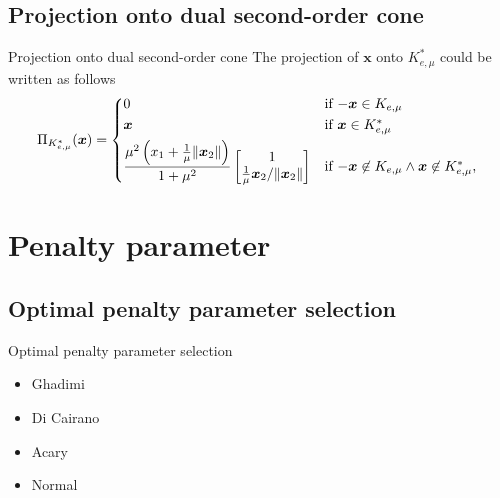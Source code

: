 \documentclass[8pt,red]{beamer}
\theoremstyle{plain}
\theoremstyle{definition}
\theoremstyle{remark}
\newcommand{\bi}[1]{\ensuremath{\boldsymbol{#1}}}
\begin{document}
\subsection{Projection onto dual second-order cone}
\begin{frame}{Projection onto dual second-order cone}
The projection of $\bi{x}$ onto $K_{e,\mu}^{*}$ could be written as follows
\begin{align}
  \Pi_{K_{e,\mu}^{*}}(\bi{x}) = 
  \begin{dcases*}
	0
    & if $-\bi{x} \in K_{e,\mu}$ \\
    \bi{x}
    & if $\bi{x} \in K_{e,\mu}^{*}$ \\
    \frac{\mu^{2} \left(x_{1} + \frac{1}{\mu} \| \bi{x}_{2} \|\right)}{1+\mu^{2}} 
    \begin{bmatrix}
      1 \\    \frac{1}{\mu} \bi{x}_{2} / \| \bi{x}_{2} \| 
    \end{bmatrix}
    & if $-\bi{x} \not\in K_{e,\mu} \wedge \bi{x} \not\in K_{e,\mu}^{*}$, \\
  \end{dcases*}  
\end{align}
\end{frame}

\section{Penalty parameter}

\subsection{Optimal penalty parameter selection}
\begin{frame}{Optimal penalty parameter selection}
\begin{itemize}
\item Ghadimi
\item Di Cairano
\item Acary
\item Normal
\end{itemize}
\end{frame}
\end{document}
